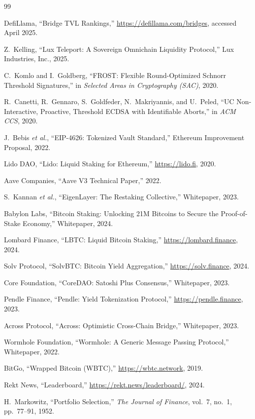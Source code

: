 \begin{thebibliography}{99}

 DefiLlama, ``Bridge TVL Rankings,'' \url{https://defillama.com/bridges}, accessed April 2025.

 Z.~Kelling, ``Lux Teleport: A Sovereign Omnichain Liquidity Protocol,'' Lux Industries, Inc., 2025.

 C.~Komlo and I.~Goldberg, ``FROST: Flexible Round-Optimized Schnorr Threshold Signatures,'' in \emph{Selected Areas in Cryptography (SAC)}, 2020.

 R.~Canetti, R.~Gennaro, S.~Goldfeder, N.~Makriyannis, and U.~Peled, ``UC Non-Interactive, Proactive, Threshold ECDSA with Identifiable Aborts,'' in \emph{ACM CCS}, 2020.

 J.~Bebis \emph{et al.}, ``EIP-4626: Tokenized Vault Standard,'' Ethereum Improvement Proposal, 2022.

 Lido DAO, ``Lido: Liquid Staking for Ethereum,'' \url{https://lido.fi}, 2020.

 Aave Companies, ``Aave V3 Technical Paper,'' 2022.

 S.~Kannan \emph{et al.}, ``EigenLayer: The Restaking Collective,'' Whitepaper, 2023.

 Babylon Labs, ``Bitcoin Staking: Unlocking 21M Bitcoins to Secure the Proof-of-Stake Economy,'' Whitepaper, 2024.

 Lombard Finance, ``LBTC: Liquid Bitcoin Staking,'' \url{https://lombard.finance}, 2024.

 Solv Protocol, ``SolvBTC: Bitcoin Yield Aggregation,'' \url{https://solv.finance}, 2024.

 Core Foundation, ``CoreDAO: Satoshi Plus Consensus,'' Whitepaper, 2023.

 Pendle Finance, ``Pendle: Yield Tokenization Protocol,'' \url{https://pendle.finance}, 2023.

 Across Protocol, ``Across: Optimistic Cross-Chain Bridge,'' Whitepaper, 2023.

 Wormhole Foundation, ``Wormhole: A Generic Message Passing Protocol,'' Whitepaper, 2022.

 BitGo, ``Wrapped Bitcoin (WBTC),'' \url{https://wbtc.network}, 2019.

 Rekt News, ``Leaderboard,'' \url{https://rekt.news/leaderboard/}, 2024.

 H.~Markowitz, ``Portfolio Selection,'' \emph{The Journal of Finance}, vol.~7, no.~1, pp.~77--91, 1952.

\end{thebibliography}

